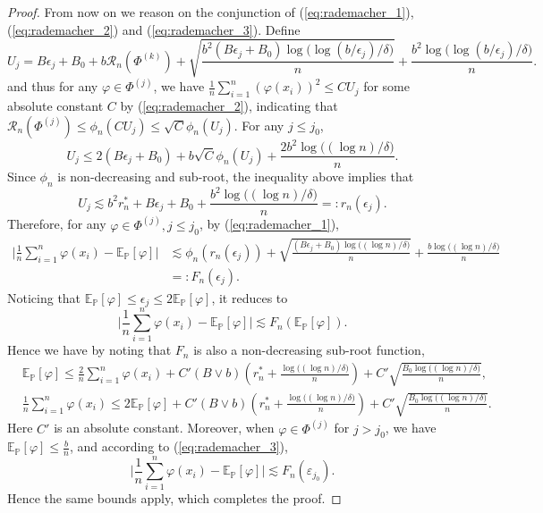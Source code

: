 \documentclass{article}
\numberwithin{equation}{section}
\def\eqref#1{equation~\ref{#1}}
\newcommand{\E}{\mathbb{E}}
\theoremstyle{definition}
\renewcommand{\P}{\mathbb{P}}
\renewcommand{\eqref}[1]{(\ref{#1})}
\begin{document}
\begin{proof}
    From now on we reason on the conjunction of \eqref{eq:rademacher_1}, \eqref{eq:rademacher_2} and \eqref{eq:rademacher_3}.
    Define 
    \begin{equation}\label{eq:def_u}
        U_j = B\epsilon_j+B_0+b\mathcal{R}_n(\Phi^{(k)})+\sqrt{\frac{b^2(B\epsilon_j+B_0)\log\big(\log(b/\epsilon_j)/\delta\big)}{n}} + \frac{b^2\log\big(\log(b/\epsilon_j)/\delta\big)}{n}.
    \end{equation}
    and thus for any $\varphi\in\Phi^{(j)}$, we have $\frac{1}{n}\sum_{i=1}^n(\varphi(x_i))^2\leq CU_j$ for some absolute constant $C$ by \eqref{eq:rademacher_2}, indicating that
    $\mathcal{R}_n(\Phi^{(j)})\leq \phi_n(CU_j)\leq \sqrt{C}\phi_n(U_j)$.
    For any $j\leq j_0$,
    \begin{equation}
        U_j \leq 2(B\epsilon_j+B_0)+b\sqrt{C}\phi_n(U_j)+\frac{2b^2\log\big((\log n)/\delta\big)}{n}.
    \end{equation}
    Since $\phi_n$ is non-decreasing and sub-root, the inequality above implies that
    \begin{equation}
        U_j \lesssim b^2r_n^*+B\epsilon_j+B_0+\frac{b^2\log\big((\log n)/\delta\big)}{n}=:r_n(\epsilon_j).
    \end{equation}
    Therefore, for any $\varphi\in\Phi^{(j)},j\leq j_0$, by \eqref{eq:rademacher_1},
    \begin{equation}
        \begin{aligned}
            \Big|\frac{1}{n}\sum_{i=1}^n\varphi(x_i)-\E_\P[\varphi]\Big| 
            &\lesssim \phi_n(r_n(\epsilon_j))+\sqrt{\frac{(B\epsilon_j+B_0)\log\big((\log n)/\delta\big)}{n}}+\frac{b\log\big((\log n)/\delta\big)}{n} \\
            &=: F_n(\epsilon_j).
        \end{aligned}
    \end{equation}
    Noticing that $\E_\P[\varphi]\leq \epsilon_j\leq 2\E_\P[\varphi]$, it reduces to
    \begin{equation}
        \Big|\frac{1}{n}\sum_{i=1}^n\varphi(x_i)-\E_\P[\varphi]\Big|\lesssim F_n(\E_\P[\varphi]).
    \end{equation}
    Hence we have by noting that $F_n$ is also a non-decreasing sub-root function, 
    \begin{align}
        &\E_\P[\varphi]\leq \frac{2}{n}\sum_{i=1}^n\varphi(x_i) + C'(B\vee b)\left(r_n^* + \frac{\log\big((\log n)/\delta\big)}{n}\right)+C'\sqrt{\frac{B_0\log\big((\log n)/\delta\big)}{n}},\\
        &\frac{1}{n}\sum_{i=1}^n\varphi(x_i)\leq 2\E_\P[\varphi]+C'(B\vee b)\left(r_n^* + \frac{\log\big((\log n)/\delta\big)}{n}\right)+C'\sqrt{\frac{B_0\log\big((\log n)/\delta\big)}{n}}.
    \end{align}
    Here $C'$ is an absolute constant. Moreover, when $\varphi\in\Phi^{(j)}$ for $j>j_0$, we have $\E_\P[\varphi]\leq \frac{b}{n}$, and according to \eqref{eq:rademacher_3},
    \begin{equation}
        \Big|\frac{1}{n}\sum_{i=1}^n\varphi(x_i)-\E_\P[\varphi]\Big|\lesssim F_n(\varepsilon_{j_0}).
    \end{equation}
    Hence the same bounds apply, which completes the proof.
\end{proof}
\end{document}

